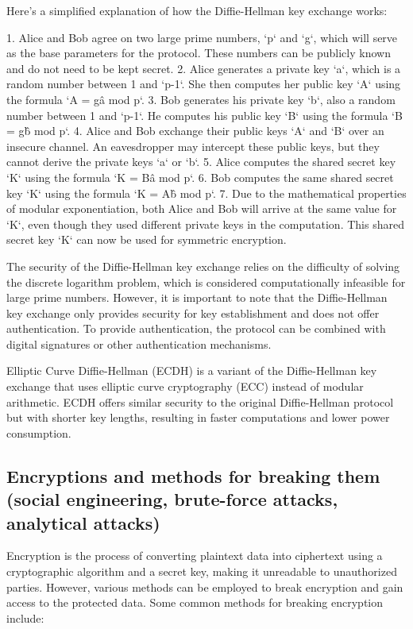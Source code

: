 \documentclass{article}
\begin{document}
Here's a simplified explanation of how the Diffie-Hellman key exchange works:

1. Alice and Bob agree on two large prime numbers, `p` and `g`, which will serve as the base parameters for the protocol. These numbers can be publicly known and do not need to be kept secret.
2. Alice generates a private key `a`, which is a random number between 1 and `p-1`. She then computes her public key `A` using the formula `A = g\^a mod p`.
3. Bob generates his private key `b`, also a random number between 1 and `p-1`. He computes his public key `B` using the formula `B = g\^b mod p`.
4. Alice and Bob exchange their public keys `A` and `B` over an insecure channel. An eavesdropper may intercept these public keys, but they cannot derive the private keys `a` or `b`.
5. Alice computes the shared secret key `K` using the formula `K = B\^a mod p`.
6. Bob computes the same shared secret key `K` using the formula `K = A\^b mod p`.
7. Due to the mathematical properties of modular exponentiation, both Alice and Bob will arrive at the same value for `K`, even though they used different private keys in the computation. This shared secret key `K` can now be used for symmetric encryption.

The security of the Diffie-Hellman key exchange relies on the difficulty of solving the discrete logarithm problem, which is considered computationally infeasible for large prime numbers. However, it is important to note that the Diffie-Hellman key exchange only provides security for key establishment and does not offer authentication. To provide authentication, the protocol can be combined with digital signatures or other authentication mechanisms.

Elliptic Curve Diffie-Hellman (ECDH) is a variant of the Diffie-Hellman key exchange that uses elliptic curve cryptography (ECC) instead of modular arithmetic. ECDH offers similar security to the original Diffie-Hellman protocol but with shorter key lengths, resulting in faster computations and lower power consumption.


\subsection{Encryptions and methods for breaking them (social engineering, brute-force attacks, analytical attacks)}

Encryption is the process of converting plaintext data into ciphertext using a cryptographic algorithm and a secret key, making it unreadable to unauthorized parties. However, various methods can be employed to break encryption and gain access to the protected data. Some common methods for breaking encryption include:
\end{document}
